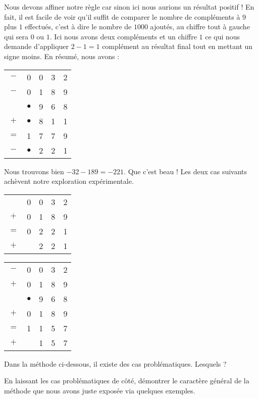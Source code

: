 Nous devons affiner notre règle car sinon ici nous aurions un résultat positif !
En fait, il est facile de voir qu'il suffit de comparer le nombre de compléments à $9$ plus $1$ effectués, c'est à dire le nombre de $1000$ ajoutés, au chiffre tout à gauche qui sera $0$ ou $1$.
Ici nous avons deux compléments et un chiffre $1$ ce qui nous demande d'appliquer $2 - 1 = 1$ complément au résultat final tout en mettant un signe moins.
En résumé, nous avons :
\begin{center}
\begin{tabular}{ccccc}
	$-$ & 0 & 0 & 3 & 2 \\
	$-$ & 0 & 1 & 8 & 9 \\
	\hline
	\hline
	    & $\bullet$ & 9 & 6 & 8 \\
	$+$ & $\bullet$ & 8 & 1 & 1 \\
	\hline
    $=$ & 1 & 7 & 7 & 9 \\
	\hline
	\hline
    $-$ & $\bullet$ & 2 & 2 & 1 \\
\end{tabular}
\end{center}


\medskip


Nous trouvons bien $- 32 - 189 = - 221$. Que c'est beau !
Les deux cas suivants achèvent notre exploration expérimentale.
\begin{multicols}{2}
\begin{center}
\begin{tabular}{ccccc}
	    & 0 & 0 & 3 & 2 \\
	$+$ & 0 & 1 & 8 & 9 \\
	\hline
	$=$ & 0 & 2 & 2 & 1 \\
	\hline
	\hline
	$+$ &   & 2 & 2 & 1 \\
\end{tabular}
\end{center}

\null\vfill

\columnbreak

\begin{center}
\begin{tabular}{ccccc}
	$-$ & 0 & 0 & 3 & 2 \\
	$+$ & 0 & 1 & 8 & 9 \\
	\hline
	\hline
	    & $\bullet$ & 9 & 6 & 8 \\
	$+$ & 0 & 1 & 8 & 9 \\
	\hline
	$=$ & 1 & 1 & 5 & 7 \\
	\hline
	\hline
	$+$ &   & 1 & 5 & 7 \\
\end{tabular}
\end{center}
\end{multicols}


\begin{exercise}
	Dans la méthode ci-dessous, il existe des cas problématiques. Lesquels ?
\end{exercise}


\begin{exercise}
	En laissant les cas problématiques de côté, démontrer le caractère général de la méthode que nous avons juste exposée via quelques exemples.
\end{exercise}

